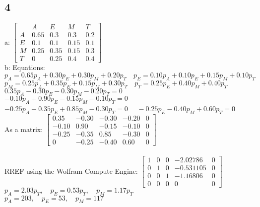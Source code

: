 \documentclass{article}
\begin{document}
\subsection*{4}
a: $\begin{bmatrix}
   &A&E&M&T\\A&0.65&0.3&0.3&0.2\\E&0.1&0.1&0.15&0.1\\M&0.25&0.35&0.15&0.3\\T&0&0.25&0.4&0.4
\end{bmatrix}$
\\[0.1in]b: Equations: $p_A = 0.65 p_A + 0.30 p_E + 0.30 p_M + 0.20 p_T \quad   p_E = 0.10 p_A + 0.10 p_E + 0.15 p_M + 0.10 p_T$ \\
$p_M = 0.25 p_A + 0.35 p_E + 0.15 p_M + 0.30 p_T  \quad p_T = 0.25 p_E + 0.40 p_M + 0.40 p_T$  \\
$0.35 p_A - 0.30 p_E - 0.30 p_M - 0.20 p_T = 0\quad$ $-0.10 p_A + 0.90 p_E - 0.15 p_M - 0.10 p_T = 0$  \\
$-0.25 p_A - 0.35 p_E + 0.85 p_M - 0.30 p_T = 0$  $\quad -0.25 p_E - 0.40 p_M + 0.60 p_T = 0$  \\
As a matrix: $\begin{bmatrix} 0.35 & -0.30 & -0.30 & -0.20 & 0 \\ -0.10 & 0.90 & -0.15 & -0.10 & 0 \\ -0.25 & -0.35 & 0.85 & -0.30 & 0 \\ 0 & -0.25 & -0.40 & 0.60 & 0 \end{bmatrix}$  \\[0.1in]
\\RREF using the Wolfram Compute Engine: $\begin{bmatrix} 
    1 & 0 & 0 & -2.02786 & 0 \\ 
    0 & 1 & 0 & -0.531105 & 0 \\ 
    0 & 0 & 1 & -1.16806 & 0 \\ 
    0 & 0 & 0 & 0 & 0 
    \end{bmatrix}$
\\[0.1in]$p_A = 2.03 p_T, \quad p_E = 0.53 p_T, \quad p_M = 1.17 p_T$  \\
$p_A = 203, \quad p_E = 53, \quad p_M = 117$  \pagebreak
\end{document}
